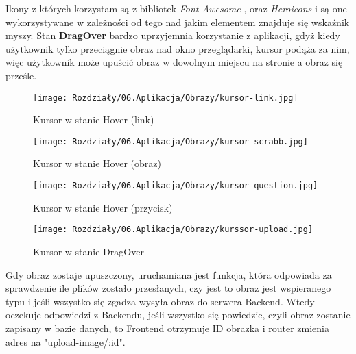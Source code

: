 Ikony z których korzystam są z bibliotek \textit{Font Awesome} \cite{fontawesome}, oraz \textit{Heroicons} \cite{heroicons} i są one wykorzystywane w zależności od tego nad jakim elementem znajduje się wskaźnik myszy.
Stan \textbf{DragOver} bardzo uprzyjemnia korzystanie z aplikacji, gdyż kiedy użytkownik tylko przeciągnie obraz nad okno przeglądarki, kursor podąża za nim, więc użytkownik może upuścić obraz w dowolnym miejscu na stronie a obraz się prześle.

\begin{figure}[ht]
    \centering
    \begin{minipage}[t]{0.47\linewidth}
        \texttt{[image: Rozdziały/06.Aplikacja/Obrazy/kursor-link.jpg]}
        \caption{Kursor w stanie Hover (link)}
        \label{fig:image89}
    \end{minipage}
    \hspace{0.5cm}
    \begin{minipage}[t]{0.47\linewidth}
        \texttt{[image: Rozdziały/06.Aplikacja/Obrazy/kursor-scrabb.jpg]}
        \caption{Kursor w stanie Hover (obraz)}
        \label{fig:image90}
    \end{minipage}
\end{figure}

\begin{figure}[ht]
    \centering
    \begin{minipage}[t]{0.47\linewidth}
        \texttt{[image: Rozdziały/06.Aplikacja/Obrazy/kursor-question.jpg]}
        \caption{Kursor w stanie Hover (przycisk)}
        \label{fig:image91}
    \end{minipage}
    \hspace{0.5cm}
    \begin{minipage}[t]{0.47\linewidth}
        \texttt{[image: Rozdziały/06.Aplikacja/Obrazy/kurssor-upload.jpg]}
        \caption{Kursor w stanie DragOver}
        \label{fig:image92}
    \end{minipage}
\end{figure}


Gdy obraz zostaje upuszczony, uruchamiana jest funkcja, która odpowiada za sprawdzenie ile plików zostało przesłanych, czy jest to obraz jest wspieranego typu i jeśli wszystko się zgadza wysyła obraz do serwera Backend. Wtedy oczekuje odpowiedzi z Backendu, jeśli wszystko się powiedzie, czyli obraz zostanie zapisany w bazie danych, to Frontend otrzymuje ID obrazka i router zmienia adres na "upload-image/:id". 



